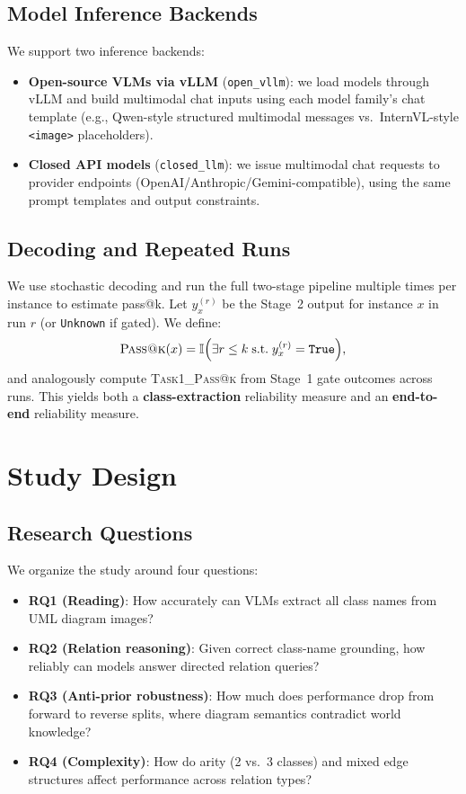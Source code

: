 \documentclass[11pt]{article}
\begin{document}
\subsection{Model Inference Backends}
\label{sec:inference}
We support two inference backends:
\begin{itemize}[leftmargin=*, itemsep=0.25em]
  \item \textbf{Open-source VLMs via vLLM} (\texttt{open\_vllm}): we load models through vLLM and build multimodal chat inputs using each model family's chat template (e.g., Qwen-style structured multimodal messages vs.\ InternVL-style \texttt{<image>} placeholders).
  \item \textbf{Closed API models} (\texttt{closed\_llm}): we issue multimodal chat requests to provider endpoints (OpenAI/Anthropic/Gemini-compatible), using the same prompt templates and output constraints.
\end{itemize}

\subsection{Decoding and Repeated Runs}
\label{sec:decoding}
We use stochastic decoding and run the full two-stage pipeline multiple times per instance to estimate pass@k.
Let $y_x^{(r)}$ be the Stage~2 output for instance $x$ in run $r$ (or \texttt{Unknown} if gated).
We define:
\begin{equation}
\textsc{Pass@k}(x) = \mathbb{I}\Big(\exists r \le k \;\text{s.t.}\; y_x^{(r)}=\texttt{True}\Big),
\end{equation}
and analogously compute \textsc{Task1\_Pass@k} from Stage~1 gate outcomes across runs.
This yields both a \textbf{class-extraction} reliability measure and an \textbf{end-to-end} reliability measure.

\section{Study Design}
\label{sec:design}

\subsection{Research Questions}
\label{sec:rqs}
We organize the study around four questions:
\begin{itemize}[leftmargin=*, itemsep=0.25em]
  \item \textbf{RQ1 (Reading)}: How accurately can VLMs extract all class names from UML diagram images?
  \item \textbf{RQ2 (Relation reasoning)}: Given correct class-name grounding, how reliably can models answer directed relation queries?
  \item \textbf{RQ3 (Anti-prior robustness)}: How much does performance drop from forward to reverse splits, where diagram semantics contradict world knowledge?
  \item \textbf{RQ4 (Complexity)}: How do arity (2 vs.\ 3 classes) and mixed edge structures affect performance across relation types?
\end{itemize}
\end{document}
